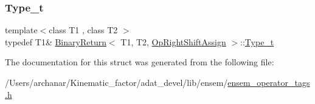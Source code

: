 \mbox{\label{structBinaryReturn_3_01T1_00_01T2_00_01OpRightShiftAssign_01_4_a4f80fa9e1ec9a2dfe91aa4777336c606}} 
\subsubsection{\texorpdfstring{Type\_t}{Type\_t}\hspace{0.1cm}{\footnotesize\ttfamily [2/2]}}
{\footnotesize\ttfamily template$<$class T1 , class T2 $>$ \\
typedef T1\& \mbox{\hyperlink{structBinaryReturn}{Binary\+Return}}$<$ T1, T2, \mbox{\hyperlink{structOpRightShiftAssign}{Op\+Right\+Shift\+Assign}} $>$\+::\mbox{\hyperlink{structBinaryReturn_3_01T1_00_01T2_00_01OpRightShiftAssign_01_4_a4f80fa9e1ec9a2dfe91aa4777336c606}{Type\+\_\+t}}}



The documentation for this struct was generated from the following file\+:\begin{DoxyCompactItemize}
\item 
/\+Users/archanar/\+Kinematic\+\_\+factor/adat\+\_\+devel/lib/ensem/\mbox{\hyperlink{lib_2ensem_2ensem__operator__tags_8h}{ensem\+\_\+operator\+\_\+tags.\+h}}\end{DoxyCompactItemize}
